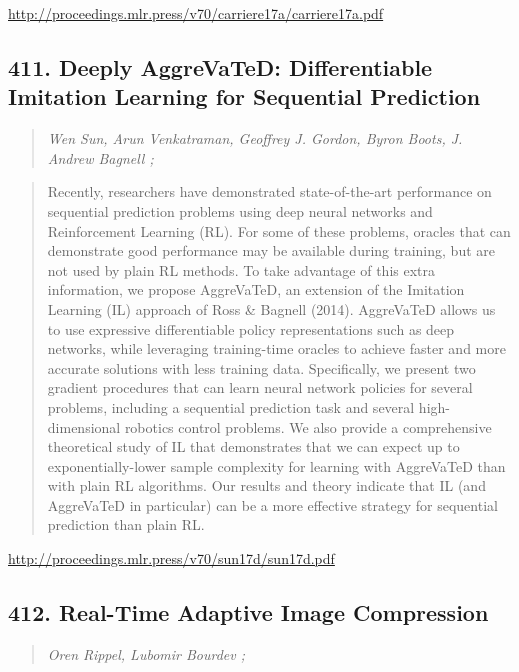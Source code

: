 \documentclass{article}
\begin{document}
\href{http://proceedings.mlr.press/v70/carriere17a/carriere17a.pdf}{http://proceedings.mlr.press/v70/carriere17a/carriere17a.pdf}

\subsection{411. Deeply AggreVaTeD: Differentiable Imitation Learning for Sequential Prediction}

\begin{quote}
\footnotesize{\textit{Wen Sun, Arun Venkatraman, Geoffrey J. Gordon, Byron Boots, J. Andrew Bagnell ;}}

\end{quote}

\begin{quote}
    Recently, researchers have demonstrated state-of-the-art performance on sequential prediction problems using deep neural networks and Reinforcement Learning (RL). For some of these problems, oracles that can demonstrate good performance may be available during training, but are not used by plain RL methods. To take advantage of this extra information, we propose AggreVaTeD, an extension of the Imitation Learning (IL) approach of Ross \& Bagnell (2014). AggreVaTeD allows us to use expressive differentiable policy representations such as deep networks, while leveraging training-time oracles to achieve faster and more accurate solutions with less training data. Specifically, we present two gradient procedures that can learn neural network policies for several problems, including a sequential prediction task and several high-dimensional robotics control problems. We also provide a comprehensive theoretical study of IL that demonstrates that we can expect up to exponentially-lower sample complexity for learning with AggreVaTeD than with plain RL algorithms. Our results and theory indicate that IL (and AggreVaTeD in particular) can be a more effective strategy for sequential prediction than plain RL.  
\end{quote}

\href{http://proceedings.mlr.press/v70/sun17d/sun17d.pdf}{http://proceedings.mlr.press/v70/sun17d/sun17d.pdf}

\subsection{412. Real-Time Adaptive Image Compression}

\begin{quote}
\footnotesize{\textit{Oren Rippel, Lubomir Bourdev ;}}

\end{quote}
\end{document}
